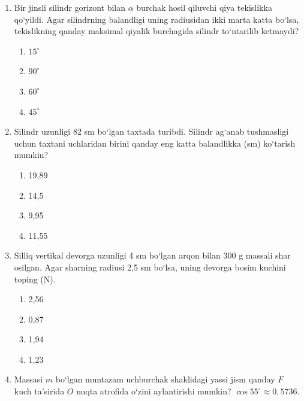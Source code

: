 \begin{enumerate}
\item Bir jinsli silindr gorizont bilan $\alpha$ burchak hosil qiluvchi qiya tekislikka qo‘yildi. Agar silindrning balandligi uning radiusidan ikki marta katta bo‘lsa, tekislikning qanday maksimal qiyalik burchagida silindr to‘ntarilib ketmaydi?
\begin{enumerate}[label=\Alph*)]
\item $15^\circ$
\item $90^\circ$
\item $60^\circ$
\item $45^\circ$
\end{enumerate}

\item Silindr uzunligi 82 sm bo‘lgan taxtada turibdi. Silindr ag‘anab tushmasligi uchun taxtani uchlaridan birini qanday eng katta balandlikka (sm) ko‘tarish mumkin? 
\begin{enumerate}[label=\Alph*)]
\item 19,89
\item 14,5
\item 9,95
\item 11,55
\end{enumerate}

\item Silliq vertikal devorga uzunligi 4 sm bo‘lgan arqon bilan 300 g massali shar osilgan. Agar sharning radiusi 2,5 sm bo‘lsa, uning devorga bosim kuchini toping (N).
\begin{enumerate}[label=\Alph*)]
\item 2,56
\item 0,87
\item 1,94
\item 1,23
\end{enumerate}

\item Massasi $m$ bo‘lgan muntazam uchburchak shaklidagi yassi jism qanday $F$ kuch ta’sirida $O$ nuqta atrofida o‘zini aylantirishi mumkin? $\cos 55^\circ \approx 0,5736$.

\end{enumerate}
